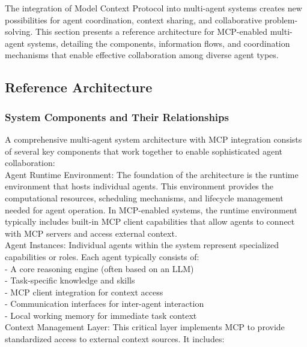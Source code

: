 The integration of Model Context Protocol into multi-agent systems creates new possibilities for agent coordination, context sharing, and collaborative problem-solving. This section presents a reference architecture for MCP-enabled multi-agent systems, detailing the components, information flows, and coordination mechanisms that enable effective collaboration among diverse agent types.\\
\subsection{Reference Architecture}
\subsubsection{System Components and Their Relationships}
A comprehensive multi-agent system architecture with MCP integration consists of several key components that work together to enable sophisticated agent collaboration:\\ \newline
Agent Runtime Environment: The foundation of the architecture is the runtime environment that hosts individual agents. This environment provides the computational resources, scheduling mechanisms, and lifecycle management needed for agent operation. In MCP-enabled systems, the runtime environment typically includes built-in MCP client capabilities that allow agents to connect with MCP servers and access external context.\\ \newline
Agent Instances: Individual agents within the system represent specialized capabilities or roles. Each agent typically consists of:\\ \newline
- A core reasoning engine (often based on an LLM)\\ \newline
- Task-specific knowledge and skills\\ \newline
- MCP client integration for context access\\ \newline
- Communication interfaces for inter-agent interaction\\ \newline
- Local working memory for immediate task context\\ \newline
Context Management Layer: This critical layer implements MCP to provide standardized access to external context sources. It includes:\\ \newline
